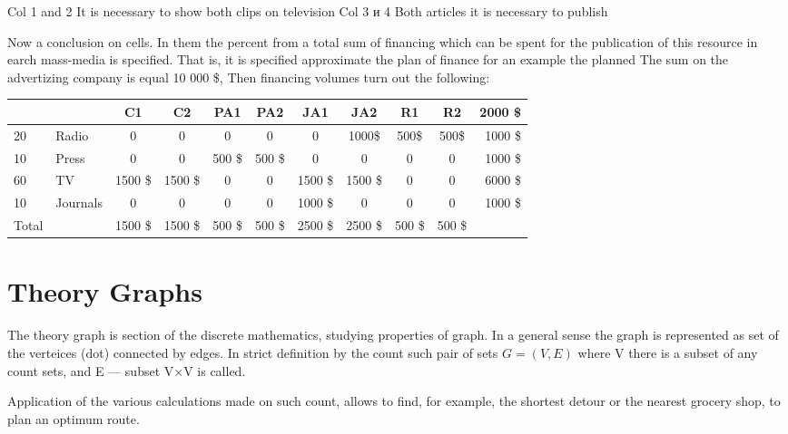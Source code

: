 \documentclass[a4paper,11pt]{scrartcl}
\begin{document}
Col 1 and  2 
It is necessary to show both clips on television
Col  3  и 4
Both articles it is necessary to publish


\bigskip

Now a conclusion on cells. In them the percent from a total sum of financing which can be spent for the publication of this resource in earch mass-media is specified. 
That is, it is specified approximate  the plan of finance for an example the planned  The sum on the advertizing company is equal 10 000 \$,
Then financing volumes turn out the following:

 \begin{tabular}{|l|l |c| c| c| c| c| c| c| c|r|}
\hline
&      &  C1 & C2  &  PA1 & PA2 & JA1 & JA2 & R1 & R2 &2000 \$\\
\hline
20&Radio &  0 & 0  &  0 & 0 & 0 & 1000\$ & 500\$ & 500\$  & 1000 \$\\
\hline
10&Press &  0 & 0  &  500 \$ & 500 \$ &  0 & 0 & 0 & 0 &1000 \$ \\
\hline
60&TV &  1500 \$ & 1500 \$  &  0 & 0 & 1500 \$ & 1500 \$ & 0 & 0 &6000 \$\\
\hline
10&Journals &  0 & 0  &  0 & 0 & 1000 \$ & 0 & 0 & 0 & 1000 \$ \\
\hline
Total & &   1500 \$&  1500 \$  &  500 \$ & 500 \$  & 2500 \$  & 2500 \$ & 500 \$  & 500 \$ & \\
\hline
\end{tabular}


\section{Theory Graphs}
\label{sec:Graphs}

The theory graph  is section  of the discrete mathematics, studying properties of graph. In a general sense the graph is represented as set of the verteices (dot) connected by edges. In strict definition by the count such pair of sets 
\begin{math} G = (V, E) \end{math}  where V there is a subset of any count sets, and E — subset V×V is called.

 Application of the various calculations made on such count, allows to find, for example, the shortest detour or the nearest grocery shop, to plan an optimum route.
\end{document}
